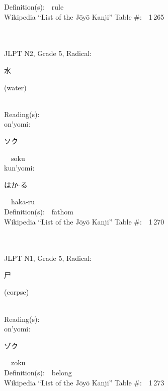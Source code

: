 \begin{multicols}{2}
Definition(s):\ \ rule \\
Wikipedia ``List of the J\=oy\=o Kanji'' Table \#:\ \ 1\,265 \\
\ \ \\
{\fontsize{34pt}{40pt}  }\ \ \\  %
{JLPT N2, Grade 5, Radical:\ \ {\begin{CJK}{UTF8}{min} 水 \end{CJK}} (water) } \\
Reading(s):\ \ \\
{\hspace*{1em}}on'yomi:\ \ \\
{\hspace*{2em}}{\begin{CJK}{UTF8}{min} ソク \end{CJK}}\ \ soku\ \ \\
{\hspace*{1em}}kun'yomi:\ \ \\
{\hspace*{2em}}{\begin{CJK}{UTF8}{min} はか-る \end{CJK}}\ \ haka-ru\ \ \\
Definition(s):\ \ fathom \\
Wikipedia ``List of the J\=oy\=o Kanji'' Table \#:\ \ 1\,270 \\
\ \ \\
{\fontsize{34pt}{40pt}  }\ \ \\  %
{JLPT N1, Grade 5, Radical:\ \ {\begin{CJK}{UTF8}{min} 尸 \end{CJK}} (corpse) } \\
Reading(s):\ \ \\
{\hspace*{1em}}on'yomi:\ \ \\
{\hspace*{2em}}{\begin{CJK}{UTF8}{min} ゾク \end{CJK}}\ \ zoku\ \ \\
Definition(s):\ \ belong \\
Wikipedia ``List of the J\=oy\=o Kanji'' Table \#:\ \ 1\,273 \\

\end{multicols}
